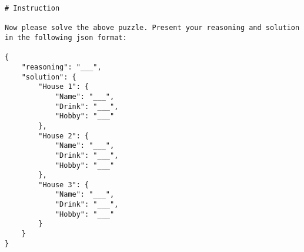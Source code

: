\begin{Verbatim}[breaklines=true, 
    breakanywhere=true,
    fontsize=\small,
    baselinestretch=0.65,
    frame=single,
    commandchars=none]
# Instruction

Now please solve the above puzzle. Present your reasoning and solution in the following json format:

{
    "reasoning": "___",
    "solution": {
        "House 1": {
            "Name": "___",
            "Drink": "___",
            "Hobby": "___"
        },
        "House 2": {
            "Name": "___",
            "Drink": "___",
            "Hobby": "___"
        },
        "House 3": {
            "Name": "___",
            "Drink": "___",
            "Hobby": "___"
        }
    }
}
\end{Verbatim}
 